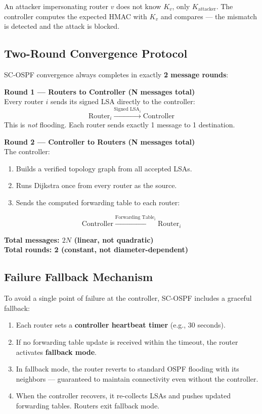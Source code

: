 \documentclass[12pt,a4paper]{article}
\begin{document}
An attacker impersonating router $v$ does not know $K_v$, only $K_{\text{attacker}}$.
The controller computes the expected HMAC with $K_v$ and compares --- the mismatch
is detected and the attack is blocked.

\subsection{Two-Round Convergence Protocol}

SC-OSPF convergence always completes in exactly \textbf{2 message rounds}:

\begin{keybox}
\textbf{Round 1 --- Routers to Controller (N messages total)}\\
Every router $i$ sends its signed LSA directly to the controller:
\[
\text{Router}_i \xrightarrow{\text{Signed LSA}_i} \text{Controller}
\]
This is \textit{not} flooding. Each router sends exactly 1 message to 1 destination.

\medskip\textbf{Round 2 --- Controller to Routers (N messages total)}\\
The controller:
\begin{enumerate}
  \item Builds a verified topology graph from all accepted LSAs.
  \item Runs Dijkstra once from every router as the source.
  \item Sends the computed forwarding table to each router:
\end{enumerate}
\[
\text{Controller} \xrightarrow{\text{Forwarding Table}_i} \text{Router}_i
\]

\textbf{Total messages: $2N$ (linear, not quadratic)}\\
\textbf{Total rounds: 2 (constant, not diameter-dependent)}
\end{keybox}

\subsection{Failure Fallback Mechanism}

To avoid a single point of failure at the controller, SC-OSPF includes a
graceful fallback:

\begin{enumerate}[itemsep=3pt]
  \item Each router sets a \textbf{controller heartbeat timer} (e.g., 30 seconds).
  \item If no forwarding table update is received within the timeout, the router
  activates \textbf{fallback mode}.
  \item In fallback mode, the router reverts to standard OSPF flooding with its
  neighbors --- guaranteed to maintain connectivity even without the controller.
  \item When the controller recovers, it re-collects LSAs and pushes updated
  forwarding tables. Routers exit fallback mode.
\end{enumerate}
\end{document}
